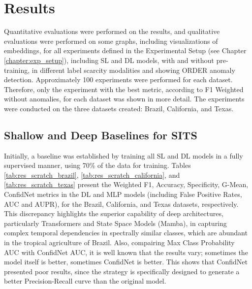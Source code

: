 \chapter{Results}
\label{chapter:results}

Quantitative evaluations were performed on the results, and qualitative evaluations were performed on some graphs, including visualizations of embeddings, for all experiments defined in the Experimental Setup (see Chapter \ref{chapter:exp_setup}), including \ac{SL} and \ac{DL} models, with and without pre-training, in different label scarcity modalities and showing ORDER anomaly detection. Approximately 100 experiments were performed for each dataset. Therefore, only the experiment with the best metric, according to F1 Weighted without anomalies, for each dataset was shown in more detail. The experiments were conducted on the three datasets created: Brazil, California, and Texas. 

\section{Shallow and Deep Baselines for SITS}

Initially, a baseline was established by training all \ac{SL} and \ac{DL} models in a fully supervised manner, using 70\% of the data for training. Tables \ref{tab:res_scratch_brazil}, \ref{tab:res_scratch_california}, and \ref{tab:res_scratch_texas} present the Weighted F1, Accuracy, Specificity, G-Mean, ConfidNet metrics in the \ac{DL} and \ac{MLP} models (including False Positive Rates, AUC and AUPR), for the Brazil, California, and Texas datasets, respectively. This discrepancy highlights the superior capability of deep architectures, particularly Transformers and State Space Models (Mamba), in capturing complex temporal dependencies in spectrally similar classes, which are abundant in the tropical agriculture of Brazil. Also, compairing Max Class Probability AUC with ConfidNet AUC, it is well known that the results vary; sometimes the model itself is better, sometimes ConfidNet is better. This shows that ConfidNet presented poor results, since the strategy is specifically designed to generate a better Precision-Recall curve than the original model.

